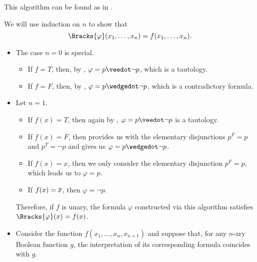 \begin{comments}
  \item This algorithm can be found as  in \cite{code}.
\end{comments}
\begin{defproof}
  We will use induction on \( n \) to show that
  \begin{equation*}
    \Bracks{\varphi}(x_1, \ldots, x_n) = f(x_1, \ldots, x_n).
  \end{equation*}

  \begin{itemize}
    \item The case \( n = 0 \) is special.
    \begin{itemize}
      \item If \( f = T \), then, by , \( \varphi = p \synvee \neg p \), which is a tautology.
      \item If \( f = F \), then, by , \( \varphi = p \synwedge \neg p \), which is a contradictory formula.
    \end{itemize}

    \item Let \( n = 1 \).
    \begin{itemize}
      \item If \( f(x) = T \), then again by , \( \varphi = p \synvee \neg p \) is a tautology.
      \item If \( f(x) = F \), then  provides us with the elementary disjunctions \( p^F = p \) and \( p^T = \neg p \) and  gives us \( \varphi = p \synwedge \neg p \).
      \item If \( f(x) = x \), then we only consider the elementary disjunction \( p^F = p \), which leads us to \( \varphi = p \).
      \item If \( f(x) = \oline{x} \), then \( \varphi = \neg p \).
    \end{itemize}

    Therefore, if \( f \) is unary, the formula \( \varphi \) constructed via this algorithm satisfies \( \Bracks{\varphi}(x) = f(x) \).

    \item Consider the function \( f(x_1, \ldots, x_n, x_{n+1}) \) and suppose that, for any \( n \)-ary Boolean function \( g \), the interpretation of its corresponding formula coincides with \( g \).


\end{itemize}
\end{defproof}
